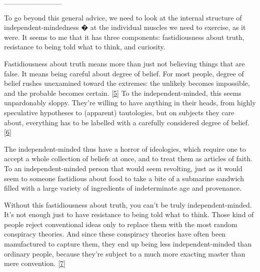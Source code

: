                   \_\_\_\_\_\_\_\_\_\_\_
                  


                  To go beyond this general advice, we need to look at the
                  internal structure of independent-mindedness � at the
                  individual muscles we need to exercise, as it were. It seems
                  to me that it has three components: fastidiousness about
                  truth, resistance to being told what to think, and
                  curiosity.

Fastidiousness about truth means more
                  than just not believing things that are false. It means being
                  careful about degree of belief. For most people, degree of
                  belief rushes unexamined toward the extremes: the unlikely
                  becomes impossible, and the probable becomes certain.
                  [\href{\#f5n}{5}]
                  To the independent-minded, this seems unpardonably sloppy.
                  They're willing to have anything in their heads, from highly
                  speculative hypotheses to (apparent) tautologies, but on
                  subjects they care about, everything has to be labelled with a
                  carefully considered degree of belief.
                  [\href{\#f6n}{6}]

The independent-minded thus have a horror of
                  ideologies, which require one to accept a whole collection of
                  beliefs at once, and to treat them as articles of faith. To an
                  independent-minded person that would seem revolting, just as
                  it would seem to someone fastidious about food to take a bite
                  of a submarine sandwich filled with a large variety of
                  ingredients of indeterminate age and provenance.

Without
                  this fastidiousness about truth, you can't be truly
                  independent-minded. It's not enough just to have resistance to
                  being told what to think. Those kind of people reject
                  conventional ideas only to replace them with the most random
                  conspiracy theories. And since these conspiracy theories have
                  often been manufactured to capture them, they end up being
                  less independent-minded than ordinary people, because they're
                  subject to a much more exacting master than mere convention.
                  [\href{\#f7n}{7}]

